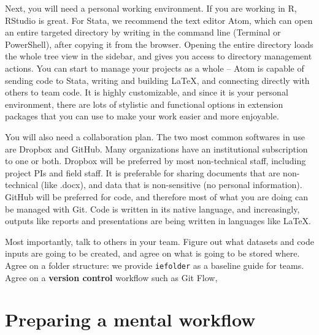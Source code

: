 Next, you will need a personal working environment.
If you are working in R, RStudio is great.
For Stata, we recommend the text editor Atom,
which can open an entire targeted directory by writing 
in the command line (Terminal or PowerShell), after copying it from the browser.
Opening the entire directory loads the whole tree view in the sidebar,
and gives you access to directory management actions.
You can start to manage your projects as a whole --
Atom is capable of sending code to Stata,
writing and building \LaTeX,
and connecting directly with others to team code.
It is highly customizable, and since it is your personal environment,
there are lots of stylistic and functional options in extension packages
that you can use to make your work easier and more enjoyable.

You will also need a collaboration plan.
The two most common softwares in use are Dropbox and GitHub.
Many organizations have an institutional subscription to one or both.
Dropbox will be preferred by most non-technical staff,
including project PIs and field staff.
It is preferable for sharing documents that are non-technical (like .docx),
and data that is non-sensitive (no personal information).
GitHub will be preferred for code,
and therefore most of what you are doing can be managed with Git.
Code is written in its native language,
and increasingly, outputs like reports
and presentations
are being written in languages like \LaTeX.

Most importantly, talk to others in your team.
Figure out what datasets and code inputs are going to be created,
and agree on what is going to be stored where.
Agree on a folder structure: we provide
\texttt{iefolder}
as a baseline guide for teams.
Agree on a \textbf{version control}\cite{blischak2016quick} workflow such as
Git Flow,




\section{Preparing a mental workflow}
